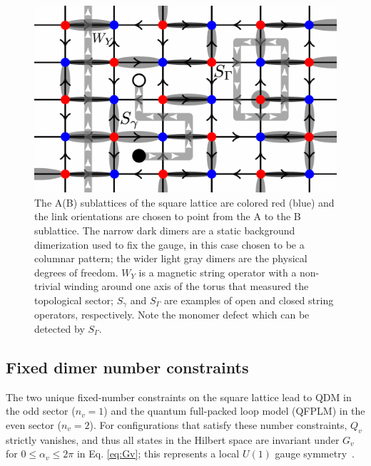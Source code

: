 \documentclass[twocolumn,prb,aps,floatfix,superscriptaddress]{revtex4-1}
\newcommand{\Eqref}[1]{Eq. \eqref{#1}}
\begin{document}
\begin{figure}[tpb]
    \centering
    \includegraphics[width=1.0\columnwidth]{mag_loops_on_orntd_lat.pdf}
    \caption{The A(B) sublattices of the square lattice are colored red (blue) and the link orientations are chosen to point from the A to the B sublattice. The narrow dark dimers are a static background dimerization used to fix the gauge, in this case chosen to be a columnar pattern; the wider light gray dimers are the physical degrees of freedom. $W_Y$ is a magnetic string operator with a non-trivial winding around one axis of the torus that measured the topological sector; $S_\gamma$ and $S_\Gamma$ are examples of open and closed string operators, respectively. Note the monomer defect which can be detected by $S_\Gamma$.}
    \label{fig:orientedSL}
\end{figure}

\subsection{Fixed dimer number constraints}

The two unique fixed-number constraints on the square lattice lead to QDM in the odd sector ($n_v = 1$) and the quantum full-packed loop model (QFPLM) in the even sector ($n_v = 2$). For configurations that satisfy these number constraints, $Q_v$ strictly vanishes, and thus all states in the Hilbert space are invariant under $G_v$ for $0 \leq \alpha_v \leq 2 \pi$ in \Eqref{eq:Gv}; this represents a local $U(1)$ gauge symmetry~\cite{Moessner2001}. 
\end{document}
